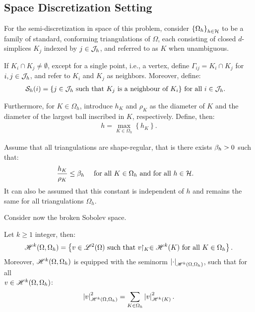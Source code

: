 \subsection{Space Discretization Setting}

For the semi-discretization in space of this problem, consider $\left\{ \Omega_{h} \right\}_{h \in \mathcal{H}}$ to be a family of standard, conforming triangulations of $\Omega$, each consisting of closed $d$-simplices $K_j$ indexed by $j \in \mathcal{J}_h$, and referred to as $K$ when unambiguous. %

If $K_i \cap K_j \neq \emptyset$, except for a single point, i.e., a vertex, define $\Gamma_{ij} = K_i \cap K_j$ for $i, j \in \mathcal{J}_h$, and refer to $K_i$ and $K_j$ as neighbors. Moreover, define:
\begin{align}
    \mathcal{S}_h(i) = \left\{ j \in \mathcal{J}_h \text{ such that } K_j \text{ is a neighbour of } K_i \right\} &\text{ for all } i \in \mathcal{J}_h.
\end{align}

Furthermore, for $K \in \Omega_h$, introduce $h_K$ and $\rho_K$ as the diameter of $K$ and the diameter of the largest ball inscribed in $K$, respectively. Define, then:
\begin{align}
    h = \max_{K \in \Omega_h} \left\{ h_K \right\}.
\end{align}

Assume that all triangulations are shape-regular, that is there exists $\beta_{h} > 0$ such that:
\begin{align}
    \frac{h_K}{\rho_K} &\leq \beta_{h} &\text{ for all } K \in \Omega_h &\text{ and for all } h \in \mathcal{H}.
\end{align}
It can also be assumed that this constant is independent of $h$ and remains the same for all triangulations $\Omega_h$.

Consider now the broken Sobolev space.
\begin{definition} %
    Let $k \geq 1$ integer, then:
    \begin{align}
        \mathscr{H}^{k}(\Omega, \Omega_h) = \left\{ v \in \mathscr{L}^{2}(\Omega) \text{ such that } v \!\!\restriction_{K} \in \mathscr{H}^{k}(K) \text{ for all } K \in \Omega_h \right\}.
    \end{align}
    Moreover, $\mathscr{H}^{k}(\Omega, \Omega_h)$ is equipped with the seminorm $\left\lvert \cdot \right\rvert_{\mathscr{H}^{k}(\Omega, \Omega_h)}$, such that for all \\ $v \in \mathscr{H}^{k}(\Omega, \Omega_h)$:
    \begin{align}
        \left\lvert v \right\rvert_{\mathscr{H}^{k}(\Omega, \Omega_h)}^2 = \sum_{K \in \Omega_h} \left\lvert v \right\rvert_{\mathscr{H}^{k}(K)}^2.
    \end{align}
\end{definition}

